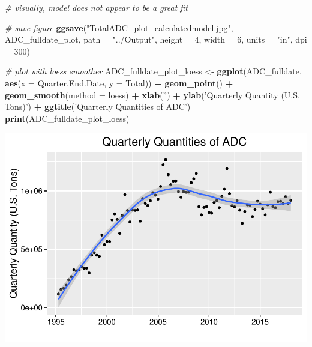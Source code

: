 \documentclass[12pt,]{article}
\newenvironment{Shaded}{\begin{snugshade}}{\end{snugshade}}
\newcommand{\KeywordTok}[1]{\textcolor[rgb]{0.13,0.29,0.53}{\textbf{#1}}}
\newcommand{\DataTypeTok}[1]{\textcolor[rgb]{0.13,0.29,0.53}{#1}}
\newcommand{\DecValTok}[1]{\textcolor[rgb]{0.00,0.00,0.81}{#1}}
\newcommand{\StringTok}[1]{\textcolor[rgb]{0.31,0.60,0.02}{#1}}
\newcommand{\CommentTok}[1]{\textcolor[rgb]{0.56,0.35,0.01}{\textit{#1}}}
\newcommand{\OperatorTok}[1]{\textcolor[rgb]{0.81,0.36,0.00}{\textbf{#1}}}
\newcommand{\NormalTok}[1]{#1}
\begin{document}
\begin{Shaded}
\begin{Highlighting}[]
\CommentTok{# visually, model does not appear to be a great fit}

\CommentTok{# save figure}
\KeywordTok{ggsave}\NormalTok{(}\StringTok{"TotalADC_plot_calculatedmodel.jpg"}\NormalTok{, ADC_fulldate_plot, }\DataTypeTok{path =} \StringTok{"../Output"}\NormalTok{, }\DataTypeTok{height =} \DecValTok{4}\NormalTok{, }\DataTypeTok{width =} \DecValTok{6}\NormalTok{, }\DataTypeTok{units =} \StringTok{"in"}\NormalTok{, }\DataTypeTok{dpi =} \DecValTok{300}\NormalTok{)}

\CommentTok{# plot with loess smoother}
\NormalTok{ADC_fulldate_plot_loess <-}\StringTok{ }\KeywordTok{ggplot}\NormalTok{(ADC_fulldate, }\KeywordTok{aes}\NormalTok{(}\DataTypeTok{x =}\NormalTok{ Quarter.End.Date, }\DataTypeTok{y =}\NormalTok{ Total)) }\OperatorTok{+}
\StringTok{  }\KeywordTok{geom_point}\NormalTok{() }\OperatorTok{+}\StringTok{ }
\StringTok{  }\KeywordTok{geom_smooth}\NormalTok{(}\DataTypeTok{method =}\NormalTok{ loess) }\OperatorTok{+}
\StringTok{  }\KeywordTok{xlab}\NormalTok{(}\StringTok{''}\NormalTok{) }\OperatorTok{+}\StringTok{ }
\StringTok{  }\KeywordTok{ylab}\NormalTok{(}\StringTok{'Quarterly Quantity (U.S. Tons)'}\NormalTok{) }\OperatorTok{+}\StringTok{ }
\StringTok{  }\KeywordTok{ggtitle}\NormalTok{(}\StringTok{'Quarterly Quantities of ADC'}\NormalTok{) }
\KeywordTok{print}\NormalTok{(ADC_fulldate_plot_loess)}
\end{Highlighting}
\end{Shaded}

\includegraphics{SKo_Project_Template_files/figure-latex/Test2-4.pdf}
\end{document}
